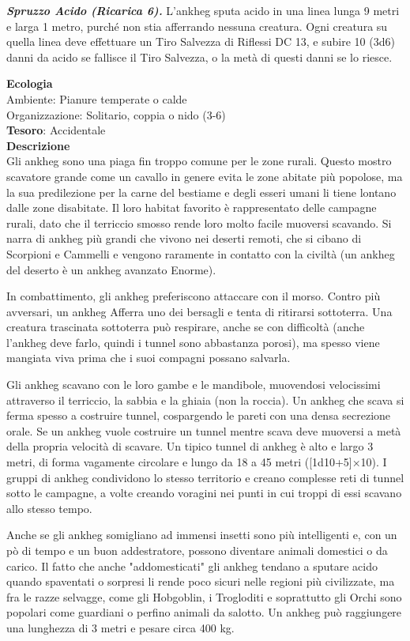\begin{multicols}{2}
	\textit{\textbf{Spruzzo Acido (Ricarica 6).}} L'ankheg sputa acido in una linea lunga 9 metri e larga 1 metro, purché non stia afferrando nessuna creatura. Ogni creatura su quella linea deve effettuare un Tiro Salvezza di Riflessi DC 13, e subire 10 (3d6) danni da acido se fallisce il Tiro Salvezza, o la metà di questi danni se lo riesce.

	\textbf{Ecologia}\\
	Ambiente: Pianure temperate o calde\\
	Organizzazione: Solitario, coppia o nido (3-6)\\
	\textbf{Tesoro}: Accidentale\\
	\textbf{Descrizione}\\
	Gli ankheg sono una piaga fin troppo comune per le zone rurali. Questo mostro scavatore grande come un cavallo in genere evita le zone abitate più popolose, ma la sua predilezione per la carne del bestiame e degli esseri umani li tiene lontano dalle zone disabitate. Il loro habitat favorito è rappresentato delle campagne rurali, dato che il terriccio smosso rende loro molto facile muoversi scavando. Si narra di ankheg più grandi che vivono nei deserti remoti, che si cibano di Scorpioni e Cammelli e vengono raramente in contatto con la civiltà (un ankheg del deserto è un ankheg avanzato Enorme).

	In combattimento, gli ankheg preferiscono attaccare con il morso. Contro più avversari, un ankheg Afferra uno dei bersagli e tenta di ritirarsi sottoterra. Una creatura trascinata sottoterra può respirare, anche se con difficoltà (anche l'ankheg deve farlo, quindi i tunnel sono abbastanza porosi), ma spesso viene mangiata viva prima che i suoi compagni possano salvarla.

	Gli ankheg scavano con le loro gambe e le mandibole, muovendosi velocissimi attraverso il terriccio, la sabbia e la ghiaia (non la roccia). Un ankheg che scava si ferma spesso a costruire tunnel, cospargendo le pareti con una densa secrezione orale. Se un ankheg vuole costruire un tunnel mentre scava deve muoversi a metà della propria velocità di scavare. Un tipico tunnel di ankheg è alto e largo 3 metri, di forma vagamente circolare e lungo da 18 a 45 metri ([1d10+5]×10). I gruppi di ankheg condividono lo stesso territorio e creano complesse reti di tunnel sotto le campagne, a volte creando voragini nei punti in cui troppi di essi scavano allo stesso tempo.

	Anche se gli ankheg somigliano ad immensi insetti sono più intelligenti e, con un pò di tempo e un buon addestratore, possono diventare animali domestici o da carico. Il fatto che anche "addomesticati" gli ankheg tendano a sputare acido quando spaventati o sorpresi li rende poco sicuri nelle regioni più civilizzate, ma fra le razze selvagge, come gli Hobgoblin, i Trogloditi e soprattutto gli Orchi sono popolari come guardiani o perfino animali da salotto. Un ankheg può raggiungere una lunghezza di 3 metri e pesare circa 400 kg.


\end{multicols}
